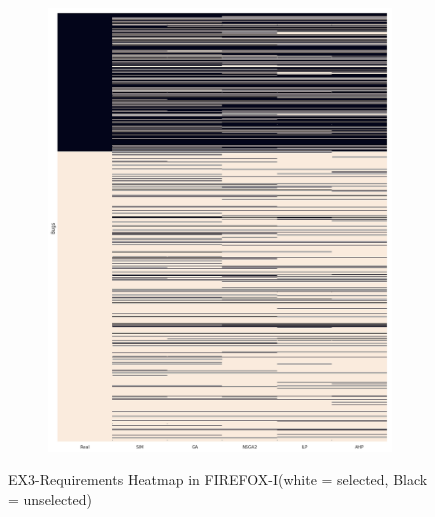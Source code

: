 \begin{figure}[h]
\centering
  \begin{subfigure}[b]{0.95\linewidth}
    \includegraphics[width=\linewidth]{images/heatmap_ff1.png}
  \end{subfigure}
  \caption{EX3-Requirements Heatmap in FIREFOX-I(white = selected, Black = unselected)}
  \label{fig:FirefoxIHeatmap}
\end{figure}
